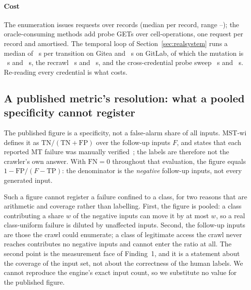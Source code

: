 \paragraph{Cost} The enumeration issues \CvgReqTotal{} requests over \CvgN{} records
(median \CvgReqMedian{} per record, range \CvgReqMin--\CvgReqMax); the oracle-consuming
methods add \CvgProbeGets{} probe GETs over \CvgProbeCells{} cell-operations, one request
per record and \CvgProbePerRecord{} amortised. The temporal loop of
Section~\ref{sec:realsystem} runs a median of \CvgLoopGiteaTotal{}~s per transition on Gitea
and \CvgLoopGitlabTotal{}~s on GitLab, of which the mutation is \CvgLoopGiteaMut{}~s and
\CvgLoopGitlabMut{}~s, the recrawl \CvgLoopGiteaRecrawl{}~s and \CvgLoopGitlabRecrawl{}~s,
and the cross-credential probe sweep \CvgLoopGiteaProbe{}~s and \CvgLoopGitlabProbe{}~s.
Re-reading every credential is what costs.



\subsection{A published metric's resolution: what a pooled specificity cannot register}
\label{sec:resolution}

The published figure is a specificity, not a false-alarm share of all inputs.
\mbox{MST-wi} defines it as $\mathrm{TN}/(\mathrm{TN}+\mathrm{FP})$ over the
follow-up inputs $F$, and states that each reported MT failure was manually
verified~\cite{Chaleshtari2022Metamorphic}; the labels are therefore not the
crawler's own answer. With $\mathrm{FN}=0$ throughout that evaluation, the figure
equals $1-\mathrm{FP}/(F-\mathrm{TP})$: the denominator is the \emph{negative}
follow-up inputs, not every generated input.

Such a figure cannot register a failure confined to a class, for two reasons that are
arithmetic and coverage rather than labelling. First, the figure is pooled: a class
contributing a share $w$ of the negative inputs can move it by at most $w$, so a real
class-uniform failure is diluted by unaffected inputs. Second, the follow-up inputs are
those the crawl could enumerate; a class of legitimate access the crawl never reaches
contributes no negative inputs and cannot enter the ratio at all. The second point is
the measurement face of Finding~1, and it is a statement about the coverage of the input
set, not about the correctness of the human labels. We cannot reproduce the engine's
exact input count, so we substitute no value for the published figure.


